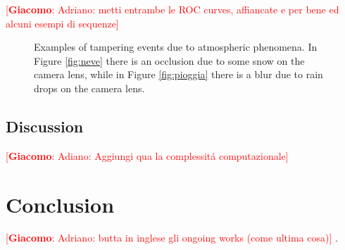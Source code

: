 \documentclass{llncs}
\newcommand{\gi}[1]{{\textcolor{red}{[\small \textbf{Giacomo}: #1]}}}
\begin{document}
\gi{Adriano: metti entrambe le ROC curves, affiancate e per bene ed alcuni esempi di sequenze}

\begin{figure}
	\centering
	\caption[Tampering examples]{Examples of tampering events due to atmospheric phenomena. In Figure \ref{fig:neve} there is an occlusion due to some snow on the camera lens, while in Figure \ref{fig:pioggia} there is a blur due to rain drops on the camera lens.}
	\label{fig:ROC}
\end{figure}



\subsection{Discussion}
\gi{Adiano: Aggiungi qua la complessit\'a computazionale}

\section{Conclusion}\label{sec:Conclusion}
\gi{Adriano: butta in inglese gli ongoing works (come ultima cosa)}
.
\end{document}
